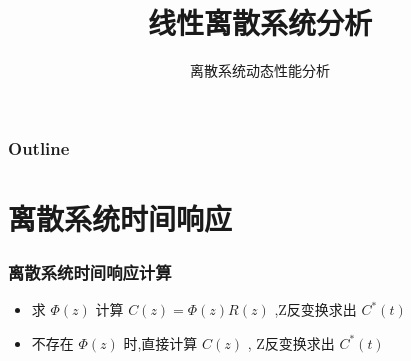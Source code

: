 \documentclass[table]{beamer}
\subtitle{离散系统动态性能分析}
\title{线性离散系统分析}
\author{}
\date{}
\begin{document}
\maketitle

\begin{frame}
\frametitle{Outline}
\setcounter{tocdepth}{3}
\tableofcontents
\end{frame}













\section{离散系统时间响应}
\label{sec-1}
\begin{frame}
\frametitle{离散系统时间响应计算}
\label{sec-1-1}

\begin{itemize}
\item 求  $\Phi(z)$  计算  $C(z)=\Phi(z)R(z)$ ,Z反变换求出  $C^*(t)$
\item 不存在  $\Phi(z)$  时,直接计算 $C(z)$  , Z反变换求出  $C^*(t)$
\end{itemize}
\end{frame}
\end{document}
